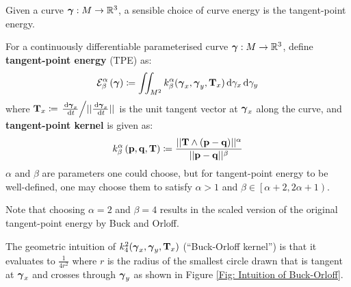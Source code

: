 \documentclass[../dissertation.tex]{subfiles}
\begin{document}
Given a curve $\boldsymbol{\gamma}:M \rightarrow \mathbb{R}^3$,
a sensible choice of curve energy is the tangent-point energy\cite{YSC2021}.
\begin{definition}
    For a continuously differentiable parameterised curve $\boldsymbol{\gamma}:M \rightarrow \mathbb{R}^3$, define \textbf{tangent-point energy} (TPE) as:
    \begin{equation}
        \mathcal{E}_{\beta}^{\alpha} \left( \boldsymbol{\gamma} \right) \coloneqq \iint_{M^2} k_{\beta}^{\alpha} (\boldsymbol{\gamma}_x, \boldsymbol{\gamma}_y, \mathbf{T}_x) \, \text{d} \gamma_x \, \text{d} \gamma_y 
        \label{equ: Tangent-Point Energy}
    \end{equation}
    where $\mathbf{T}_x \coloneqq \left. \frac{\, \text{d} \boldsymbol{\gamma}_x}{\, \text{d} t} \middle/ \lvert \lvert \frac{\, \text{d} \boldsymbol{\gamma}_x}{\, \text{d} t} \rvert \rvert \right. $ is the unit tangent vector at $\boldsymbol{\gamma}_x$ along the curve,
    and \textbf{tangent-point kernel} is given as:
    \begin{equation}
        k_{\beta}^{\alpha} \left( \mathbf{p}, \mathbf{q}, \mathbf{T} \right) \coloneqq \frac{\lvert \lvert \mathbf{T} \wedge \left( \mathbf{p} - \mathbf{q} \right) \rvert \rvert^{\alpha}}{\lvert \lvert \mathbf{p} - \mathbf{q} \rvert \rvert^{\beta}}
    \end{equation}
    $\alpha$ and $\beta$ are parameters one could choose, but for tangent-point energy to be well-defined,
    one may choose them to satisfy $\alpha >1$ and $\beta \in \left[ \alpha+2, 2\alpha + 1 \right)$.

    Note that choosing $\alpha = 2$ and $\beta = 4$ results in the scaled version of the original tangent-point energy by Buck and Orloff\cite{BO1995}.
\end{definition}
The geometric intuition of $k_{4}^2 (\boldsymbol{\gamma}_x, \boldsymbol{\gamma}_y, \mathbf{T}_x)$ (``Buck-Orloff kernel'') is that it evaluates to $\frac{1}{4r^2}$ where $r$ is the radius of the smallest circle drawn that is tangent at $\boldsymbol{\gamma}_x$ and crosses through $\boldsymbol{\gamma}_y$
as shown in Figure \ref{Fig: Intuition of Buck-Orloff}.
\end{document}
